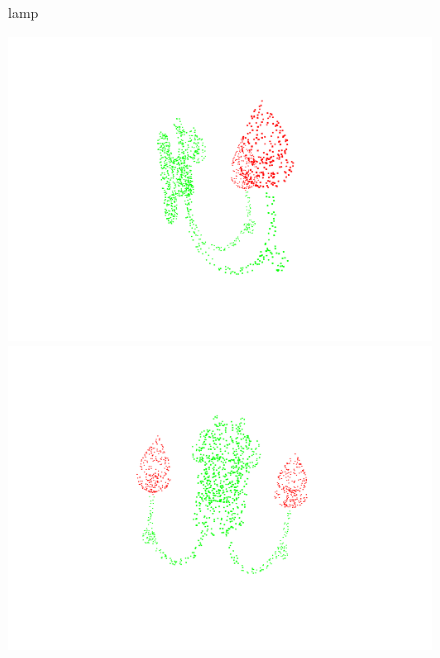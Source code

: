\begin{figure}[htbp]
    \begin{minipage}{0.1\textwidth}
        \centering
        {lamp}
    \end{minipage}
    \hfill
    \begin{minipage}{0.25\textwidth}
        \centering
        \includegraphics[width=\textwidth]{fig/supplement/part_segmentation/lamp/lamp00.pdf}
    \end{minipage}
    \hfill
    \begin{minipage}{0.25\textwidth}
        \centering
        \includegraphics[width=\textwidth]{fig/supplement/part_segmentation/lamp/lamp01.pdf}
    \end{minipage}
    \hfill
    \begin{minipage}{0.25\textwidth}

\end{minipage}
\end{figure}
